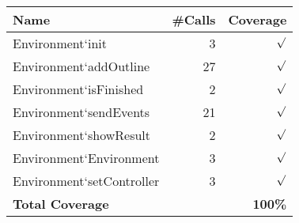 \begin{longtable}{|l|r|r|}\hline
{\bf Name} & {\bf \#Calls} & {\bf Coverage} \\ \hline\hline
\endhead
Environment`init & 3 & $\surd$ \\ \hline
Environment`addOutline & 27 & $\surd$ \\ \hline
Environment`isFinished & 2 & $\surd$ \\ \hline
Environment`sendEvents & 21 & $\surd$ \\ \hline
Environment`showResult & 2 & $\surd$ \\ \hline
Environment`Environment & 3 & $\surd$ \\ \hline
Environment`setController & 3 & $\surd$ \\ \hline
\hline
{\bf Total Coverage} & & {\bf 100\%} \\ \hline
\end{longtable}

